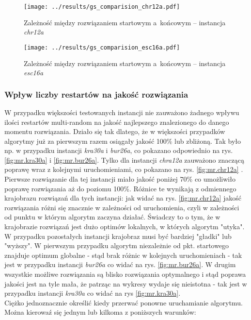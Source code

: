 \documentclass{article}
\begin{document}
			\begin{figure}[h]
				\texttt{[image: ../results/gs\_comparision\_chr12a.pdf]}
				\caption{Zależność między rozwiązaniem startowym a~końcowym -- instancja \emph{chr12a}\label{fig:gs.chr12a}}				
			\end{figure}
			
			\begin{figure}[h]
				\texttt{[image: ../results/gs\_comparision\_esc16a.pdf]}
				\caption{Zależność między rozwiązaniem startowym a~końcowym -- instancja \emph{esc16a}\label{fig:gs.esc16a}}				
			\end{figure}
		
		\subsubsection{Wpływ liczby restartów na jakość rozwiązania}		
			W przypadku większości testowanych instancji nie zauważono żadnego wpływu ilości restartów multi-random na jakość najlepszego znalezionego do danego momentu rozwiązania. Działo się tak dlatego, że w większości przypadków algorytmy już za pierwszym razem osiągały jakość  100\%  lub zbliżoną. Tak było np. w przypadku instancji \emph{kra30a} i \emph{bur26a}, co pokazano odpowiednio na rys. \ref{fig:mr.kra30a} i \ref{fig:mr.bur26a}. Tylko dla instancji \emph{chra12a} zauważono znaczącą poprawę wraz z kolejnymi uruchomieniami, co pokazano na rys. \ref{fig:mr.chr12a}  . Pierwsze rozwiązanie dla tej instancji miało jakość poniżej 70\% co umożliwiło poprawę rozwiązania aż do poziomu 100\%. Różnice te wynikają z odmiennego krajobrazu rozwiązań dla tych instancji: jak widać na rys. \ref{fig:mr.chr12a} jakość rozwiązania różni się znacznie w zależności od uruchomienia, czyli w zależności od punktu w którym algorytm zaczyna działać. Świadczy to o tym, że w krajobrazie rozwiązań jest dużo optimów lokalnych, w których algorytm "utyka". W przypadku pozostałych instancji krajobraz musi być bardziej "gładki" lub "wyższy". W pierwszym przypadku algorytm niezależnie od pkt. startowego znajduje optimum globalne  - stąd brak różnic w kolejnych uruchomieniach - tak jest w przypadku instancji \emph{bur26a} co widać na rys. \ref{fig:mr.bur26a}. W drugim wszystkie możliwe rozwiązania są blisko rozwiązania optymalnego i stąd poprawa jakości jest na tyle mała, że patrząc na wykresy wydaje się nieistotna - tak jest w przypadku instancji \emph{kra30a} co widać na rys \ref{fig:mr.kra30a}.
			\\Ciężko jednoznacznie określić kiedy przerwać ponowne uruchamianie algorytmu. Można kierowaź się jednym lub kilkoma z poniższych warunków:
\end{document}
